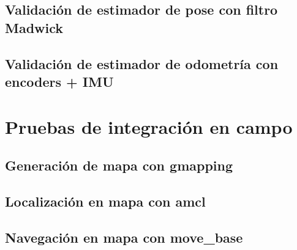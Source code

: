 \subsection{Validación de estimador de pose con filtro Madwick}
\subsection{Validación de estimador de odometría con encoders + IMU}
\section{Pruebas de integración en campo}
\subsection{Generación de mapa con gmapping}
\subsection{Localización en mapa con amcl}
\subsection{Navegación en mapa con move\_base}